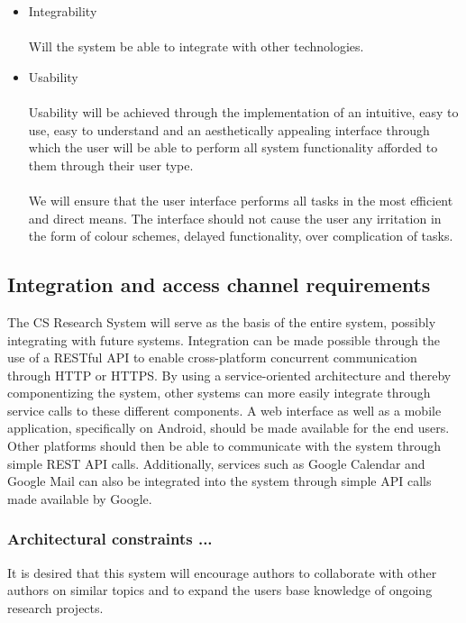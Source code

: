 \documentclass[a4paper]{article}
\begin{document}
\begin{itemize}
		
		\item Integrability \\\\
		Will the system be able to integrate with other technologies.
		\item Usability \\\\
		Usability will be achieved through the implementation of an intuitive, easy to use, easy to understand and an aesthetically appealing interface through which the user will be able to perform all system functionality afforded to them through their user type.
		\\\\
		We will ensure that the user interface performs all tasks in the most efficient and direct means. The interface should not cause the user any irritation in the form of colour schemes, delayed functionality, over complication of tasks.
	\end{itemize}
	
	
	\subsection{Integration and access channel requirements}
	The CS Research System will serve as the basis of the entire system, possibly integrating with future systems. Integration can be made possible through the use of a RESTful API to enable cross-platform concurrent communication through HTTP or HTTPS. By using a service-oriented architecture and thereby componentizing the system, other systems can more easily integrate through service calls to these different components. A web interface as well as a mobile application, specifically on Android, should be made available for the end users. Other platforms should then be able to communicate with the system through simple REST API calls. Additionally, services such as Google Calendar and Google Mail can also be integrated into the system through simple API calls made available by Google. 
	\\
	
	\subsubsection{Architectural constraints ... }
	
	It is desired that this system will encourage authors to collaborate with other authors on similar topics and to expand the users base knowledge of ongoing research projects.
	\\
	\\
	\\
	
\end{document}
